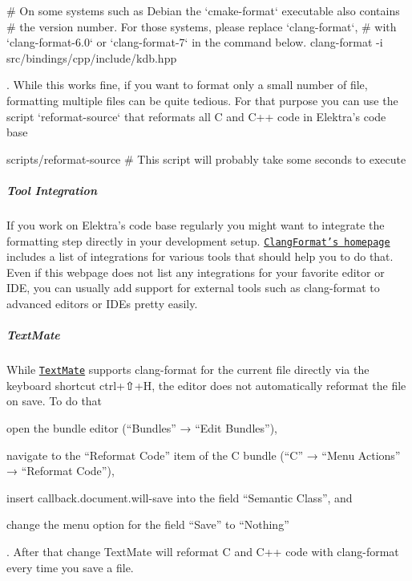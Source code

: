 \begin{DoxyCode}
# On some systems such as Debian the `cmake-format` executable also contains
# the version number. For those systems, please replace `clang-format`,
# with `clang-format-6.0` or `clang-format-7` in the command below.
clang-format -i src/bindings/cpp/include/kdb.hpp
\end{DoxyCode}


. While this works fine, if you want to format only a small number of file, formatting multiple files can be quite tedious. For that purpose you can use the script `reformat-\/source` that reformats all C and C++ code in Elektra’s code base


\begin{DoxyCode}
scripts/reformat-source # This script will probably take some seconds to execute
\end{DoxyCode}


\subparagraph*{Tool Integration}

If you work on Elektra’s code base regularly you might want to integrate the formatting step directly in your development setup. \href{https://clang.llvm.org/docs/ClangFormat.html}{\tt Clang\+Format’s homepage} includes a list of integrations for various tools that should help you to do that. Even if this webpage does not list any integrations for your favorite editor or I\+DE, you can usually add support for external tools such as {\ttfamily clang-\/format} to advanced editors or I\+D\+Es pretty easily.

\subparagraph*{Text\+Mate}

While \href{https://macromates.com}{\tt Text\+Mate} supports {\ttfamily clang-\/format} for the current file directly via the keyboard shortcut {\ttfamily ctrl}+{\ttfamily ⇧}+{\ttfamily H}, the editor does not automatically reformat the file on save. To do that


\begin{DoxyEnumerate}
\item open the bundle editor (“\+Bundles” → “\+Edit Bundles”),
\item navigate to the “\+Reformat Code” item of the C bundle (“\+C” → “\+Menu Actions” → “\+Reformat Code”),
\item insert {\ttfamily callback.\+document.\+will-\/save} into the field “\+Semantic Class”, and
\item change the menu option for the field “\+Save” to “\+Nothing”
\end{DoxyEnumerate}

. After that change Text\+Mate will reformat C and C++ code with {\ttfamily clang-\/format} every time you save a file.

